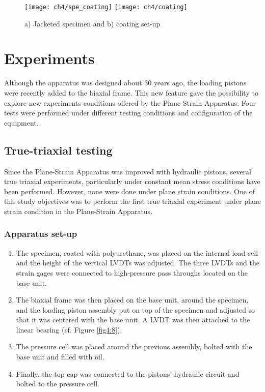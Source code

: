 \begin{figure}[tb]
    \centering
    \texttt{[image: ch4/spe\_coating]}
    \texttt{[image: ch4/coating]}
    \caption{a) Jacketed specimen and b) coating set-up}
    \label{fig4:7}
\end{figure} 

\section{Experiments} \label{ch4:exp}

Although the apparatus was designed about 30 years ago, the loading pistons were recently added to the biaxial frame. This new feature gave the possibility to explore new experiments conditions offered by the Plane-Strain Apparatus. Four tests were performed under different testing conditions and configuration of the equipment. 

\subsection{True-triaxial testing }

Since the Plane-Strain Apparatus was improved with hydraulic pistons, several true triaxial experiments, particularly under constant mean stress conditions have been performed. However, none were done under plane strain conditions. One of this study objectives was to perform the first true triaxial experiment under plane strain condition in the Plane-Strain Apparatus. 

\subsubsection{Apparatus set-up}

\begin{enumerate}
    \item The specimen, coated with polyurethane, was placed on the internal load cell and the height of the vertical LVDTs was adjusted. The three LVDTs and the strain gages were connected to high-pressure pass throughs located on the base unit. 
    \item The biaxial frame was then placed on the base unit, around the specimen, and the loading piston assembly put on top of the specimen and adjusted so that it was centered with the base unit. A LVDT was then attached to the linear bearing (cf. Figure \ref{fig4:8}). 
    \item The pressure cell was placed around the previous assembly, bolted with the base unit and filled with oil. 
    \item Finally, the top cap was connected to the pistons’ hydraulic circuit and bolted to the pressure cell. 
\end{enumerate}


